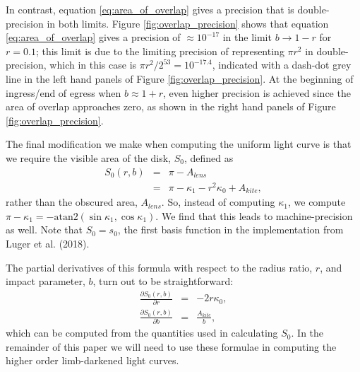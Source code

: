 \documentclass[modern]{aastex61}
\begin{document}
In contrast, equation \ref{eq:area_of_overlap} gives a precision
that is double-precision in both limits.  Figure
\ref{fig:overlap_precision} shows that equation \ref{eq:area_of_overlap} 
gives a precision of $\approx 10^{-17}$ in the limit $b \rightarrow
1-r$ for $r=0.1$; this limit is due to the limiting precision of
representing $\pi r^2$ in double-precision, which in this case
is $\pi r^2 / 2^{53} = 10^{-17.4}$, indicated with a dash-dot
grey line in the left hand panels of Figure \ref{fig:overlap_precision}.
At the beginning of ingress/end of egress when $b \approx 1+r$, 
even higher precision is achieved since the area of overlap approaches
zero, as shown in the right hand panels of Figure \ref{fig:overlap_precision}.

The final modification we make when computing the uniform light
curve is that we require the visible area of the disk, $S_0$, defined as
\begin{eqnarray} \label{eq:uniform}
S_0(r,b) &=& \pi-A_{lens}\\
&=&\pi -\kappa_1 - r^2\kappa_0 + A_{kite},
\end{eqnarray}
rather than the obscured area, $A_{lens}$.  So, instead of computing $\kappa_1$,
we compute $\pi-\kappa_1 = -\mathrm{atan2}(\sin{\kappa_1},\cos{\kappa_1})$.
We find that this leads to machine-precision as well.  Note that $S_0=s_0$,
the first basis function in the \starry implementation from Luger et al. (2018).

The partial derivatives of this formula with respect to the radius
ratio, $r$, and impact parameter, $b$, turn out to be straightforward:
\begin{eqnarray}
\frac{\partial S_0(r,b)}{\partial r} &=& -2r \kappa_0,\\
\frac{\partial S_0(r,b)}{\partial b} &=& \frac{A_{kite}}{b},
\end{eqnarray}
which can be computed from the quantities used in calculating $S_0$.
In the remainder of this paper we will need to use these formulae in computing
the higher order limb-darkened light curves.
\end{document}
